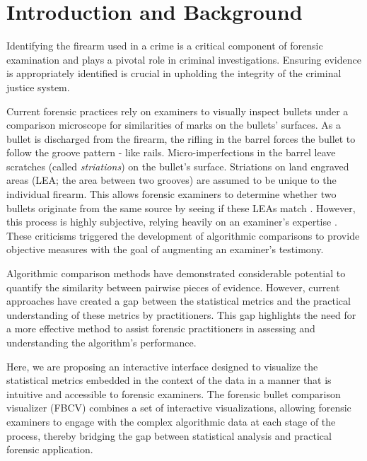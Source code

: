 \documentclass[
  12pt]{article}
\begin{document}
\section{Introduction and Background}\label{sec-intro}

Identifying the firearm used in a crime is a critical component of
forensic examination and plays a pivotal role in criminal
investigations. Ensuring evidence is appropriately identified is crucial
in upholding the integrity of the criminal justice system.

Current forensic practices rely on examiners to visually inspect bullets
under a comparison microscope for similarities of marks on the bullets'
surfaces. As a bullet is discharged from the firearm, the rifling in the
barrel forces the bullet to follow the groove pattern - like rails.
Micro-imperfections in the barrel leave scratches (called
\emph{striations}) on the bullet's surface. Striations on land engraved
areas (LEA; the area between two grooves) are assumed to be unique to
the individual firearm. This allows forensic examiners to determine
whether two bullets originate from the same source by seeing if these
LEAs match \citep{afte}. However, this process is highly subjective,
relying heavily on an examiner's expertise \citep{nas2009, pcast}. These
criticisms triggered the development of algorithmic comparisons
\citep{carriquiryMachineLearningForensic2019, chenFiredBulletSignature2019, chuAutomaticIdentificationBullet2013, juOpenSourceImplementationCMPS2022, vorburgerApplicationsCrosscorrelationFunctions2011, vorburgerTopographyMeasurementsApplications2015}
to provide objective measures with the goal of augmenting an examiner's
testimony.

Algorithmic comparison methods have demonstrated considerable potential
to quantify the similarity between pairwise pieces of evidence. However,
current approaches have created a gap between the statistical metrics
and the practical understanding of these metrics by practitioners. This
gap highlights the need for a more effective method to assist forensic
practitioners in assessing and understanding the algorithm's
performance.

Here, we are proposing an interactive interface designed to visualize
the statistical metrics embedded in the context of the data
\citep{wickhamVisualizingStatisticalModels2015} in a manner that is
intuitive and accessible to forensic examiners. The forensic bullet
comparison visualizer (FBCV) combines a set of interactive
visualizations, allowing forensic examiners to engage with the complex
algorithmic data at each stage of the process, thereby bridging the gap
between statistical analysis and practical forensic application.
\end{document}
